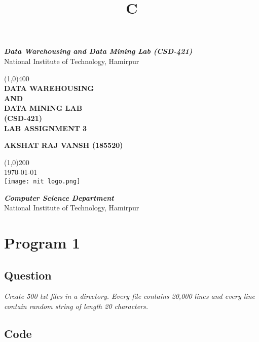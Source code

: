 \documentclass{article}
\title{C}
\begin{document}
\begin{titlepage}
	\begin{center}
	\vspace{1cm}

	{\normalsize \textbf{\textit{Data Warehousing and Data Mining Lab (CSD-421)}} \\ 
	    National Institute of Technology, Hamirpur \par}
		\vspace{1.0cm}
    \line(1,0){400}\\
    [0.65cm]
	\huge{\bfseries DATA WAREHOUSING\\ AND\\ DATA MINING LAB\\(CSD-421)\\LAB ASSIGNMENT 3}\\
	\vspace{1.3cm}
	{\large \textbf { 
	AKSHAT RAJ VANSH (185520)}\par}
	\line(1,0){200}\\
	\vspace{1.0cm}
	\textsc{\LARGE \today}\\
	[1.0cm]     
	
    
    {\texttt{[image: nit logo.png]}}\\
    \vspace{1.5cm}
    {\normalsize \textbf{\textit{Computer Science Department}} \\ 
	    National Institute of Technology, Hamirpur \par}
    \vspace{0.5cm}
    \end{center}
	
\end{titlepage}
\tableofcontents{}
\clearpage


\section{Program 1}
\subsection{Question}
	{\large \textit { 
Create 500 txt files in a directory. Every file contains 20,000 lines and every line
contain random string of length 20 characters.}\par}
\subsection{Code}
\inputminted[frame=lines,linenos]
{python}{Codes/question1/main.py}
\pagebreak
\end{document}
